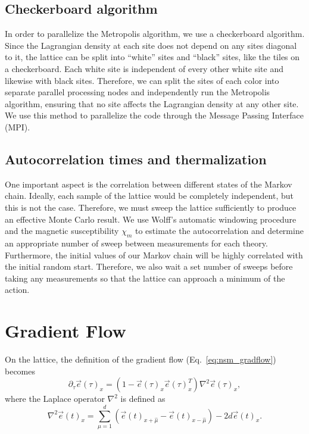 \documentclass[12pt]{report}
\newcommand{\e}{\vec e}
\begin{document}
\subsection{Checkerboard algorithm}

In order to parallelize the Metropolis algorithm, we use a checkerboard algorithm. Since the Lagrangian density at each site does not depend on any sites diagonal to it, the lattice can be split into ``white'' sites and ``black'' sites, like the tiles on a checkerboard. Each white site is independent of every other white site and likewise with black sites. Therefore, we can split the sites of each color into separate parallel processing nodes and independently run the Metropolis algorithm, ensuring that no site affects the Lagrangian density at any other site. We use this method to parallelize the code through the Message Passing Interface (MPI).

\subsection{Autocorrelation times and thermalization}
One important aspect is the correlation between different states of the Markov chain. Ideally, each sample of the lattice would be completely independent, but this is not the case. Therefore, we must sweep the lattice sufficiently to produce an effective Monte Carlo result. We use Wolff's automatic windowing procedure \cite{wolff2007} and the magnetic susceptibility $\chi_m$ to estimate the autocorrelation and determine an appropriate number of sweep between measurements for each theory. Furthermore, the initial values of our Markov chain will be highly correlated with the initial random start. Therefore, we also wait a set number of sweeps before taking any measurements so that the lattice can approach a minimum of the action.

\section{Gradient Flow}
\label{sec:gradflow_disc}
On the lattice, the definition of the gradient flow (Eq.~\ref{eq:nsm_gradflow}) becomes 
\begin{equation}
    \label{eq:nsm_gradflow_disc}
    \partial_\tau \e (\tau)_x = \left( 1 - \e(\tau)_x \e(\tau)_x^T\right) \nabla^2 \e(\tau)_x,
\end{equation}
 where the Laplace operator $\nabla^2$ is defined as
\begin{equation*}
    \nabla^2 \e(t)_x = \sum^d_{\mu=1} \left( \e(t)_{x+\hat \mu} - \e(t)_{x-\hat \mu}\right) - 2 d \e(t)_x.
\end{equation*}
\end{document}
